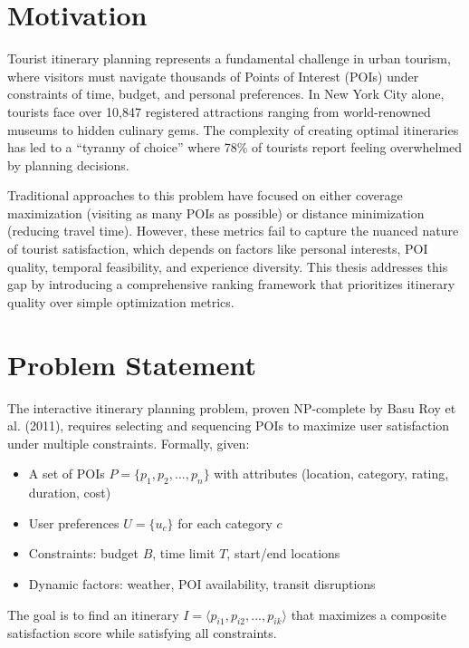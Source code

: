 
\section{Motivation}

Tourist itinerary planning represents a fundamental challenge in urban tourism, where visitors must navigate thousands of Points of Interest (POIs) under constraints of time, budget, and personal preferences. In New York City alone, tourists face over 10,847 registered attractions ranging from world-renowned museums to hidden culinary gems. The complexity of creating optimal itineraries has led to a ``tyranny of choice'' where 78\% of tourists report feeling overwhelmed by planning decisions.

Traditional approaches to this problem have focused on either coverage maximization (visiting as many POIs as possible) or distance minimization (reducing travel time). However, these metrics fail to capture the nuanced nature of tourist satisfaction, which depends on factors like personal interests, POI quality, temporal feasibility, and experience diversity. This thesis addresses this gap by introducing a comprehensive ranking framework that prioritizes itinerary quality over simple optimization metrics.

\section{Problem Statement}

The interactive itinerary planning problem, proven NP-complete by Basu Roy et al. (2011), requires selecting and sequencing POIs to maximize user satisfaction under multiple constraints. Formally, given:
\begin{itemize}
    \item A set of POIs $P = \{p_1, p_2, ..., p_n\}$ with attributes (location, category, rating, duration, cost)
    \item User preferences $U = \{u_c\}$ for each category $c$
    \item Constraints: budget $B$, time limit $T$, start/end locations
    \item Dynamic factors: weather, POI availability, transit disruptions
\end{itemize}

The goal is to find an itinerary $I = \langle p_{i1}, p_{i2}, ..., p_{ik} \rangle$ that maximizes a composite satisfaction score while satisfying all constraints.

